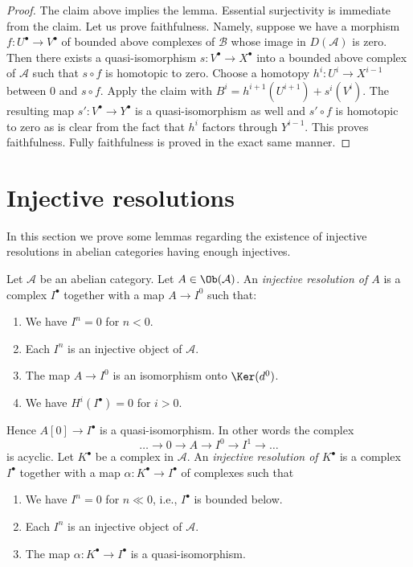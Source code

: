 \begin{proof}
\medskip\noindent
The claim above implies the lemma. Essential surjectivity is immediate
from the claim. Let us prove faithfulness. Namely, suppose we have
a morphism $f : U^\bullet \to V^\bullet$ of bounded above complexes
of $\mathcal{B}$ whose image in $D(\mathcal{A})$ is zero. Then
there exists a quasi-isomorphism $s : V^\bullet \to X^\bullet$
into a bounded above complex of $\mathcal{A}$ such that
$s \circ f$ is homotopic to zero. Choose a homotopy
$h^i : U^i \to X^{i - 1}$ between $0$ and $s \circ f$.
Apply the claim with $B^i = h^{i + 1}(U^{i + 1}) + s^i(V^i)$.
The resulting map $s' : V^\bullet \to Y^\bullet$
is a quasi-isomorphism as well and $s' \circ f$ is homotopic
to zero as is clear from the fact that $h^i$ factors through $Y^{i - 1}$.
This proves faithfulness. Fully faithfulness is proved in the
exact same manner.
\end{proof}





\section{Injective resolutions}
\label{section-injective-resolutions}

\noindent
In this section we prove some lemmas regarding the existence
of injective resolutions in abelian categories having enough injectives.

\begin{definition}
\label{definition-injective-resolution}
Let $\mathcal{A}$ be an abelian category.
Let $A \in \Ob(\mathcal{A})$.
An {\it injective resolution of $A$} is a complex
$I^\bullet$ together with a map $A \to I^0$ such
that:
\begin{enumerate}
\item We have $I^n = 0$ for $n < 0$.
\item Each $I^n$ is an injective object of $\mathcal{A}$.
\item The map $A \to I^0$ is an isomorphism onto $\Ker(d^0)$.
\item We have $H^i(I^\bullet) = 0$ for $i > 0$.
\end{enumerate}
Hence $A[0] \to I^\bullet$ is a quasi-isomorphism.
In other words the complex
$$
\ldots \to 0 \to A \to I^0 \to I^1 \to \ldots
$$
is acyclic.
Let $K^\bullet$ be a complex in $\mathcal{A}$.
An {\it injective resolution of $K^\bullet$} is a complex
$I^\bullet$ together with a map $\alpha : K^\bullet \to I^\bullet$
of complexes such that
\begin{enumerate}
\item We have $I^n = 0$ for $n \ll 0$, i.e., $I^\bullet$ is bounded below.
\item Each $I^n$ is an injective object of $\mathcal{A}$.
\item The map $\alpha : K^\bullet \to I^\bullet$ is a
quasi-isomorphism.
\end{enumerate}
\end{definition}

